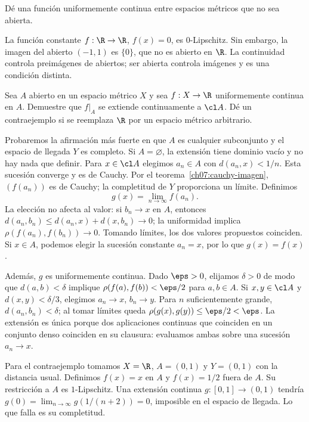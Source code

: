 \begin{ejercicio}\label{ej:lectura-7-4}
Dé una función uniformemente continua entre espacios métricos que no sea abierta.
\end{ejercicio}
\begin{solucion}
La función constante $f:\R\to\R$, $f(x)=0$, es $0$-Lipschitz. Sin embargo, la imagen del abierto $(-1,1)$ es $\{0\}$, que no es abierto en $\R$. La continuidad controla preimágenes de abiertos; ser abierta controla imágenes y es una condición distinta.
\end{solucion}

\begin{ejercicio}\label{ej:lectura-7-5}\label{ch07:ej-extension}
Sea $A$ abierto en un espacio métrico $X$ y sea $f:X\to\R$ uniformemente continua en $A$. Demuestre que $f|_A$ se extiende continuamente a $\cl A$. Dé un contraejemplo si se reemplaza $\R$ por un espacio métrico arbitrario.
\end{ejercicio}
\begin{solucion}
Probaremos la afirmación más fuerte en que $A$ es cualquier subconjunto y el espacio de llegada $Y$ es completo. Si $A=\varnothing$, la extensión tiene dominio vacío y no hay nada que definir. Para $x\in\cl A$ elegimos $a_n\in A$ con $d(a_n,x)<1/n$. Esta sucesión converge y es de Cauchy. Por el teorema~\ref{ch07:cauchy-imagen}, $(f(a_n))$ es de Cauchy; la completitud de $Y$ proporciona un límite. Definimos
\[
 g(x)=\lim_{n\to\infty}f(a_n).
\]
La elección no afecta al valor: si $b_n\to x$ en $A$, entonces $d(a_n,b_n)\leq d(a_n,x)+d(x,b_n)\to0$; la uniformidad implica $\rho(f(a_n),f(b_n))\to0$. Tomando límites, los dos valores propuestos coinciden. Si $x\in A$, podemos elegir la sucesión constante $a_n=x$, por lo que $g(x)=f(x)$.

Además, $g$ es uniformemente continua. Dado $\eps>0$, elijamos $\delta>0$ de modo que $d(a,b)<\delta$ implique $\rho(f(a),f(b))<\eps/2$ para $a,b\in A$. Si $x,y\in\cl A$ y $d(x,y)<\delta/3$, elegimos $a_n\to x$, $b_n\to y$. Para $n$ suficientemente grande, $d(a_n,b_n)<\delta$; al tomar límites queda $\rho(g(x),g(y))\leq\eps/2<\eps$. La extensión es única porque dos aplicaciones continuas que coinciden en un conjunto denso coinciden en su clausura: evaluamos ambas sobre una sucesión $a_n\to x$.

Para el contraejemplo tomamos $X=\R$, $A=(0,1)$ y $Y=(0,1)$ con la distancia usual. Definimos $f(x)=x$ en $A$ y $f(x)=1/2$ fuera de $A$. Su restricción a $A$ es $1$-Lipschitz. Una extensión continua $g:[0,1]\to(0,1)$ tendría $g(0)=\lim_{n\to\infty}g(1/(n+2))=0$, imposible en el espacio de llegada. Lo que falla es su completitud.
\end{solucion}

